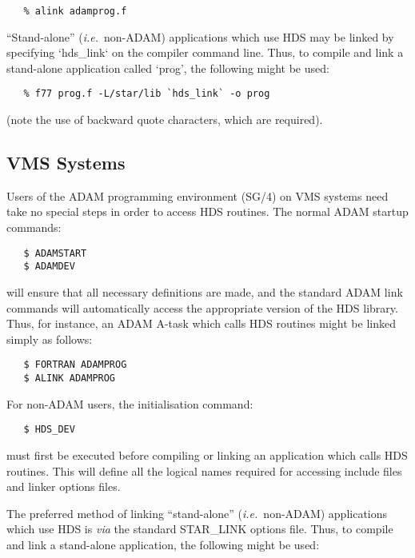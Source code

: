 \small
\begin{verbatim}
   % alink adamprog.f
\end{verbatim}
\normalsize

``Stand-alone'' ({\em i.e.}\ non-ADAM) applications which use HDS may be linked
by specifying `hds\_link` on the compiler command line. Thus, to compile and
link a stand-alone application called `prog', the following might be used:

\small
\begin{verbatim}
   % f77 prog.f -L/star/lib `hds_link` -o prog
\end{verbatim}
\normalsize

(note the use of backward quote characters, which are required).

\subsection{VMS Systems}

Users of the ADAM programming environment (SG/4) on VMS systems need take no
special steps in order to access HDS routines. The normal ADAM startup commands:

\small
\begin{verbatim}
   $ ADAMSTART
   $ ADAMDEV
\end{verbatim}
\normalsize

will ensure that all necessary definitions are made, and the standard ADAM link
commands will automatically access the appropriate version of the HDS library.
Thus, for instance, an ADAM A-task which calls HDS routines might be linked
simply as follows:

\small
\begin{verbatim}
   $ FORTRAN ADAMPROG
   $ ALINK ADAMPROG
\end{verbatim}
\normalsize

For non-ADAM users, the initialisation command:

\small
\begin{verbatim}
   $ HDS_DEV
\end{verbatim}
\normalsize

must first be executed before compiling or linking an application which calls
HDS routines. This will define all the logical names required for accessing
include files and linker options files.

The preferred method of linking ``stand-alone'' ({\em i.e.}\ non-ADAM)
applications which use HDS is {\em via} the standard STAR\_LINK options file.
Thus, to compile and link a stand-alone application, the following might be
used:

